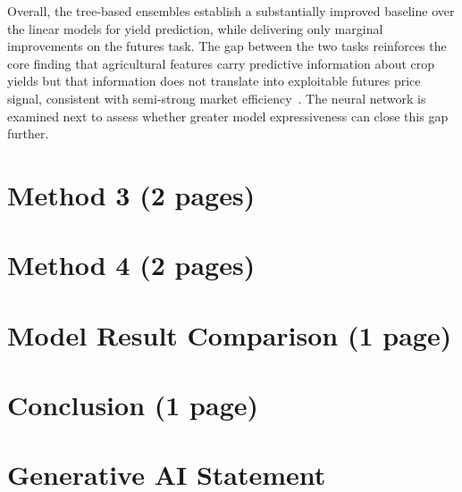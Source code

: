 \documentclass[pdflatex,sn-mathphys-num, oneside]{sn-jnl}%
\theoremstyle{thmstyleone}%
\theoremstyle{thmstyletwo}%
\theoremstyle{thmstylethree}%
\begin{document}
Overall, the tree-based ensembles establish a substantially improved baseline over the linear models for yield prediction, while delivering only marginal improvements on the futures task. The gap between the two tasks reinforces the core finding that agricultural features carry predictive information about crop yields but that information does not translate into exploitable futures price signal, consistent with semi-strong market efficiency~\cite{bib30}. The neural network is examined next to assess whether greater model expressiveness can close this gap further.


\clearpage

\section{Method 3 (2 pages)}\label{sec3}

\clearpage

\section{Method 4 (2 pages)}\label{sec3}

\clearpage

\section{Model Result Comparison (1 page)}\label{sec3}

\clearpage

\section{Conclusion (1 page)}\label{sec3}

\clearpage


\clearpage

\section{Generative AI Statement}

\clearpage
\end{document}
